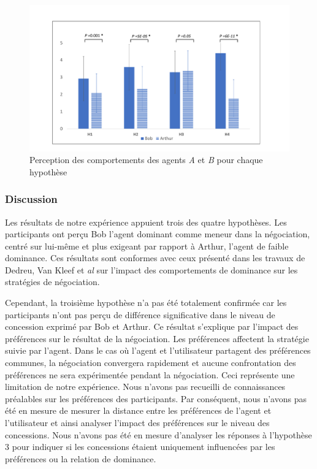 {			
			\begin{figure}[t]
				\centering
				\includegraphics[width=\textwidth]{Figures/chap4/AH/res.pdf}
				\caption{Perception des comportements des agents \textit{A} et \textit{B} pour chaque hypothèse}
				\label{res}
				\end{figure}
				
				\subsubsection{Discussion}
				
				Les résultats de notre expérience appuient trois des quatre hypothèses. Les participants ont perçu Bob l'agent dominant comme meneur dans la négociation, centré sur lui-même et plus exigeant par rapport à Arthur, l'agent de faible dominance. Ces résultats sont conformes avec ceux présenté dans les travaux de Dedreu, Van Kleef et \emph{al} \cite {de1995impact, de2004influence, de2004influence} sur l'impact des comportements de dominance sur les stratégies de négociation.
				
				Cependant, la troisième hypothèse n'a pas été totalement confirmée car les participants n'ont pas perçu de différence significative dans le niveau de concession exprimé par Bob et Arthur. Ce résultat s'explique par l'impact des préférences sur le résultat de la négociation. Les préférences affectent la stratégie suivie par l'agent. Dans le cas où l'agent et l'utilisateur partagent des préférences communes, la négociation convergera rapidement et aucune confrontation des préférences ne sera expérimentée pendant la négociation. Ceci représente une limitation de notre expérience. Nous n'avons pas recueilli de connaissances préalables sur les préférences des participants. Par conséquent, nous n'avons pas été en mesure de mesurer la distance entre les préférences de l'agent et l'utilisateur et ainsi analyser l'impact des préférences sur le niveau des concessions.
				Nous n'avons pas été en mesure d'analyser les réponses à l'hypothèse 3 pour indiquer si les concessions étaient uniquement influencées par les préférences ou la relation de dominance. 
			
}
